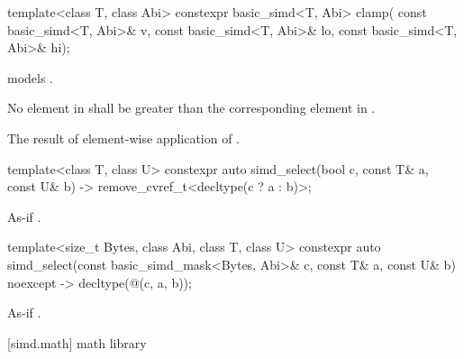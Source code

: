 \begin{itemdecl}
template<class T, class Abi>
  constexpr basic_simd<T, Abi> clamp(
    const basic_simd<T, Abi>& v, const basic_simd<T, Abi>& lo, const basic_simd<T, Abi>& hi);
\end{itemdecl}

\begin{itemdescr}
  \pnum\constraints
   models .

  \pnum\expects
  No element in  shall be greater than the corresponding element in .

  \pnum\returns
  The result of element-wise application of  \foralli.
\end{itemdescr}

\begin{itemdecl}
  template<class T, class U>
    constexpr auto simd_select(bool c, const T& a, const U& b)
    -> remove_cvref_t<decltype(c ? a : b)>;
\end{itemdecl}

\begin{itemdescr}
    \pnum\returns As-if .
\end{itemdescr}

\begin{itemdecl}
  template<size_t Bytes, class Abi, class T, class U>
    constexpr auto simd_select(const basic_simd_mask<Bytes, Abi>& c, const T& a, const U& b)
    noexcept -> decltype(@\simdselect@(c, a, b));
\end{itemdecl}

\begin{itemdescr}
    \pnum\returns As-if .
\end{itemdescr}

[simd.math]{ math library}

